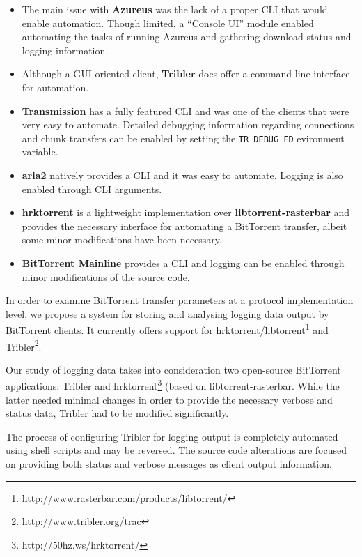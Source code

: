\begin{itemize}

  \item The main issue with \textbf{Azureus} was the lack of a proper CLI that
  would enable automation. Though limited, a ``Console UI'' module enabled
  automating the tasks of running Azureus and gathering download status and
  logging information.

  \item Although a GUI oriented client, \textbf{Tribler} does offer a command
  line interface for automation.

  \item \textbf{Transmission} has a fully featured CLI and was one of the
  clients that were very easy to automate. Detailed debugging information
  regarding connections and chunk transfers can be enabled by setting the
  \texttt{TR\_DEBUG\_FD} evironment variable.

  \item \textbf{aria2} natively provides a CLI and it was easy to automate.
  Logging is also enabled through CLI arguments.

  \item \textbf{hrktorrent} is a lightweight implementation over
  \textbf{libtorrent-rasterbar} and provides the necessary interface for
  automating a BitTorrent transfer, albeit some minor modifications have been
  necessary.

  \item \textbf{BitTorrent Mainline} provides a CLI and logging can be enabled
  through minor modifications of the source code.

\end{itemize}


In order to examine BitTorrent transfer parameters at a protocol
implementation level, we propose a system for storing and analysing logging
data output by BitTorrent clients. It currently offers support for
hrktorrent/libtorrent\footnote{http://www.rasterbar.com/products/libtorrent/}
and Tribler\footnote{http://www.tribler.org/trac}.

Our study of logging data takes into consideration two open-source BitTorrent
applications: Tribler and hrktorrent\footnote{http://50hz.ws/hrktorrent/}
(based on libtorrent-rasterbar. While the latter needed minimal changes in
order to provide the necessary verbose and status data, Tribler had to be
modified significantly.

The process of configuring Tribler for logging output is completely automated
using shell scripts and may be reversed. The source code alterations are
focused on providing both status and verbose messages as client output
information.

